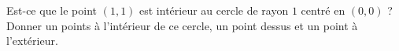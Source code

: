 
\begin{exercice}\label{exoSeconde-0009}

    Est-ce que le point \( (1,1)\) est intérieur au cercle de rayon \( 1\) centré en \( (0,0)\) ? Donner un points à l'intérieur de ce cercle, un point dessus et un point à l'extérieur.

\end{exercice}
